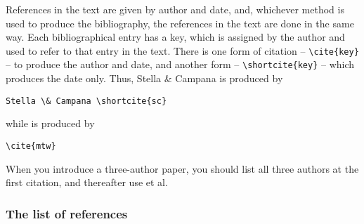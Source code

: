 References in the text are given by author and date, and, whichever
method is used to produce the bibliography, the references in the text
are done in the same way. Each bibliographical entry has a key, which
is assigned by the author and used to refer to that entry in the text.
There is one form of citation -- \verb"\cite{key}" -- to produce the
author and date, and another form -- \verb"\shortcite{key}" -- which
produces the date only. Thus, Stella \& Campana  is
produced by
%
\begin{verbatim}
Stella \& Campana \shortcite{sc}
\end{verbatim}
%
while \cite{mtw} is produced by
%
\begin{verbatim}
\cite{mtw}
\end{verbatim}
%
When you introduce a three-author paper, you should list all
three authors at the first citation, and thereafter use et al.

\subsubsection{The list of references}

